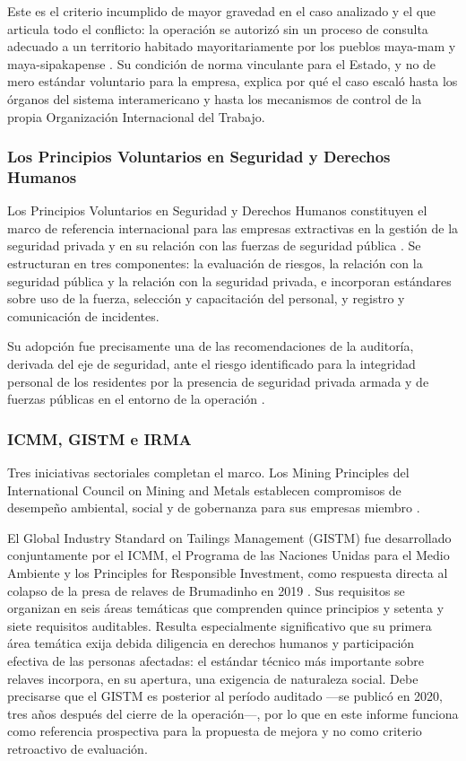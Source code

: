 Este es el criterio incumplido de mayor gravedad en el caso analizado y el que
articula todo el conflicto: la operación se autorizó sin un proceso de consulta
adecuado a un territorio habitado mayoritariamente por los pueblos maya-mam y
maya-sipakapense \parencite{oncommonground2010hria}. Su condición de norma
vinculante para el Estado, y no de mero estándar voluntario para la empresa,
explica por qué el caso escaló hasta los órganos del sistema interamericano y
hasta los mecanismos de control de la propia Organización Internacional del
Trabajo.

\subsubsection{Los Principios Voluntarios en Seguridad y Derechos Humanos}

Los Principios Voluntarios en Seguridad y Derechos Humanos constituyen el marco de
referencia internacional para las empresas extractivas en la gestión de la
seguridad privada y en su relación con las fuerzas de seguridad pública
\parencite{vpshrsfprincipios}. Se estructuran en tres componentes: la evaluación
de riesgos, la relación con la seguridad pública y la relación con la seguridad
privada, e incorporan estándares sobre uso de la fuerza, selección y capacitación
del personal, y registro y comunicación de incidentes.

Su adopción fue precisamente una de las recomendaciones de la auditoría, derivada
del eje de seguridad, ante el riesgo identificado para la integridad personal de
los residentes por la presencia de seguridad privada armada y de fuerzas públicas
en el entorno de la operación \parencite{oncommonground2010hria}.

\subsubsection{ICMM, GISTM e IRMA}

Tres iniciativas sectoriales completan el marco. Los Mining Principles del
International Council on Mining and Metals establecen compromisos de desempeño
ambiental, social y de gobernanza para sus empresas miembro
\parencite{icmmsfprincipios}.

El Global Industry Standard on Tailings Management (GISTM) fue desarrollado
conjuntamente por el ICMM, el Programa de las Naciones Unidas para el Medio
Ambiente y los Principles for Responsible Investment, como respuesta directa al
colapso de la presa de relaves de Brumadinho en 2019
\parencite{icmm2020gistm}. Sus requisitos se organizan en seis
áreas temáticas que comprenden quince principios y setenta y siete requisitos
auditables. Resulta especialmente significativo que su primera área temática exija
debida diligencia en derechos humanos y participación efectiva de las personas
afectadas: el estándar técnico más importante sobre relaves incorpora, en su
apertura, una exigencia de naturaleza social. Debe precisarse que el GISTM es
posterior al período auditado —se publicó en 2020, tres años después del cierre de
la operación—, por lo que en este informe funciona como referencia prospectiva
para la propuesta de mejora y no como criterio retroactivo de evaluación.

